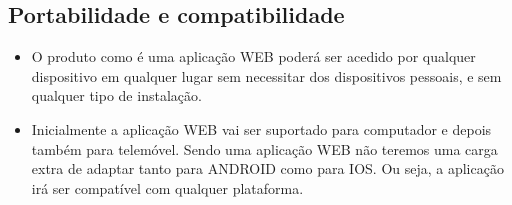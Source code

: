 \subsection{Portabilidade e compatibilidade}
\begin{itemize}
    \item O produto como é uma aplicação WEB poderá ser acedido por qualquer dispositivo em qualquer lugar sem necessitar dos dispositivos pessoais, e sem qualquer tipo de instalação.
    \item Inicialmente a aplicação WEB vai ser suportado para computador e depois também para telemóvel. Sendo uma aplicação WEB não teremos uma carga extra de adaptar tanto para ANDROID como para IOS. Ou seja, a aplicação irá ser compatível com qualquer plataforma.
\end{itemize}

